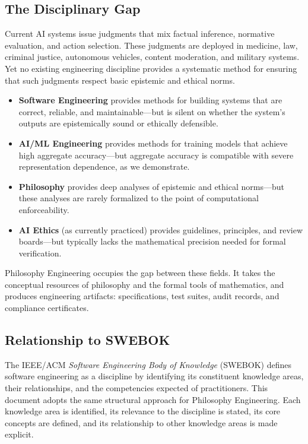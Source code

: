 \documentclass[12pt,letterpaper]{article}
\theoremstyle{definition}
\theoremstyle{plain}
\begin{document}
\subsection{The Disciplinary Gap}

Current AI systems issue judgments that mix factual inference, normative evaluation, and action selection. These judgments are deployed in medicine, law, criminal justice, autonomous vehicles, content moderation, and military systems. Yet no existing engineering discipline provides a systematic method for ensuring that such judgments respect basic epistemic and ethical norms.

\begin{itemize}
    \item \textbf{Software Engineering} provides methods for building systems that are correct, reliable, and maintainable---but is silent on whether the system's outputs are epistemically sound or ethically defensible.
    \item \textbf{AI/ML Engineering} provides methods for training models that achieve high aggregate accuracy---but aggregate accuracy is compatible with severe representation dependence, as we demonstrate.
    \item \textbf{Philosophy} provides deep analyses of epistemic and ethical norms---but these analyses are rarely formalized to the point of computational enforceability.
    \item \textbf{AI Ethics} (as currently practiced) provides guidelines, principles, and review boards---but typically lacks the mathematical precision needed for formal verification.
\end{itemize}

Philosophy Engineering occupies the gap between these fields. It takes the conceptual resources of philosophy and the formal tools of mathematics, and produces engineering artifacts: specifications, test suites, audit records, and compliance certificates.

\subsection{Relationship to SWEBOK}

The IEEE/ACM \emph{Software Engineering Body of Knowledge} (SWEBOK) \cite{bourque2014swebok} defines software engineering as a discipline by identifying its constituent knowledge areas, their relationships, and the competencies expected of practitioners. This document adopts the same structural approach for Philosophy Engineering. Each knowledge area is identified, its relevance to the discipline is stated, its core concepts are defined, and its relationship to other knowledge areas is made explicit.
\end{document}
